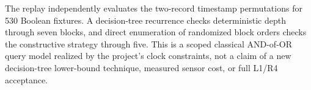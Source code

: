 \documentclass[11pt]{article}
\begin{document}
The replay independently evaluates the two-record timestamp
permutations for 530 Boolean fixtures. A decision-tree recurrence
checks deterministic depth through seven blocks, and direct
enumeration of randomized block orders checks the constructive
strategy through five. This is a scoped classical AND-of-OR
query model realized by the project's clock constraints, not a
claim of a new decision-tree lower-bound technique, measured
sensor cost, or full L1/R4 acceptance.
\end{document}
